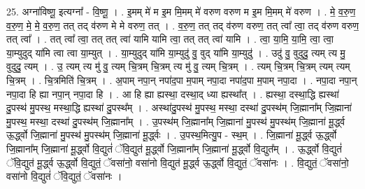\documentclass[17pt]{extarticle}
\begin{document}
25. अग्ना॑विष्णू॒ इत्यग्ना᳚ - वि॒ष्णू॒ । . इ॒मम् मे॑ म इ॒म मि॒मम् मे॑ वरुण वरुण म इ॒म मि॒मम् मे॑ वरुण । . मे॒ व॒रु॒ण॒ व॒रु॒ण॒ मे॒ मे॒ व॒रु॒ण॒ तत् तद् व॑रुण मे मे वरुण॒ तत् । . व॒रु॒ण॒ तत् तद् व॑रुण वरुण॒ तत् त्वा᳚ त्वा॒ तद् व॑रुण वरुण॒ तत् त्वा᳚ । . तत् त्वा᳚ त्वा॒ तत् तत् त्वा॑ यामि यामि त्वा॒ तत् तत् त्वा॑ यामि । . त्वा॒ या॒मि॒ या॒मि॒ त्वा॒ त्वा॒ या॒म्युदुद् या॑मि त्वा त्वा या॒म्युत् । . या॒म्युदुद् या॑मि या॒म्युदु॑ वु॒ वुद् या॑मि या॒म्युदु॑ । . उदु॑ वु॒ वुदुदु॒ त्यम् त्य मु॒ वुदुदु॒ त्यम् । . उ॒ त्यम् त्य मु॑ वु॒ त्यम् चि॒त्रम् चि॒त्रम् त्य मु॑ वु॒ त्यम् चि॒त्रम् । . त्यम् चि॒त्रम् चि॒त्रम् त्यम् त्यम् चि॒त्रम् । . चि॒त्रमिति॑ चि॒त्रम् । . अ॒पाम् नपा॒न् नपा॑द॒पा म॒पाम् नपा॒दा नपा॑द॒पा म॒पाम् नपा॒दा । . नपा॒दा नपा॒न् नपा॒दा हि ह्या नपा॒न् नपा॒दा हि । . आ हि ह्या  ह्यस्था॒  दस्था॒द् ध्या ह्यस्था᳚त् । . ह्यस्था॒ दस्था॒द्धि ह्यस्था॑ दु॒पस्थ॑ मु॒पस्थ॒ मस्था॒द्धि ह्यस्था॑ दु॒पस्थ᳚म् । . अस्था॑दु॒पस्थ॑ मु॒पस्थ॒ मस्था॒ दस्था॑ दु॒पस्थ॑म् जि॒ह्माना᳚म् जि॒ह्माना॑ मु॒पस्थ॒ मस्था॒ दस्था॑ दु॒पस्थ॑म् जि॒ह्माना᳚म् । . उ॒पस्थ॑म् जि॒ह्माना᳚म् जि॒ह्माना॑ मु॒पस्थ॑ मु॒पस्थ॑म् जि॒ह्माना॑ मू॒र्द्ध्व ऊ॒र्द्ध्वो जि॒ह्माना॑ मु॒पस्थ॑ मु॒पस्थ॑म् जि॒ह्माना॑ मू॒र्द्ध्वः । . उ॒पस्थ॒मित्यु॒प - स्थ॒म् । . जि॒ह्माना॑ मू॒र्द्ध्व ऊ॒र्द्ध्वो जि॒ह्माना᳚म् जि॒ह्माना॑ मू॒र्द्ध्वो वि॒द्युतं॑ ॅवि॒द्युत॑ मू॒र्द्ध्वो जि॒ह्माना᳚म् जि॒ह्माना॑ मू॒र्द्ध्वो वि॒द्युत᳚म् । . ऊ॒र्द्ध्वो वि॒द्युतं॑ ॅवि॒द्युत॑ मू॒र्द्ध्व ऊ॒र्द्ध्वो वि॒द्युतं॒ ॅवसा॑नो॒ वसा॑नो वि॒द्युत॑ मू॒र्द्ध्व ऊ॒र्द्ध्वो वि॒द्युतं॒ ॅवसा॑नः । . वि॒द्युतं॒ ॅवसा॑नो॒ वसा॑नो वि॒द्युतं॑ ॅवि॒द्युतं॒ ॅवसा॑नः । \newline
\end{document}

